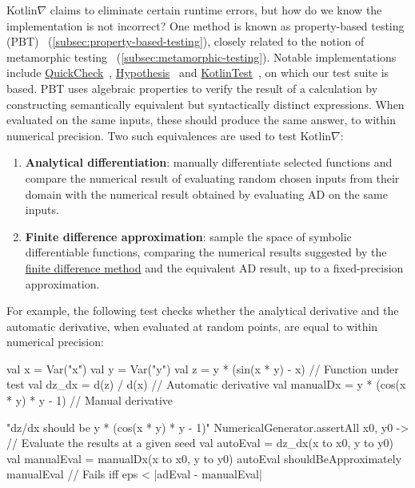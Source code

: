 \documentclass[12pt,initial,twoside,maitrise]{dms}
\numberwithin{equation}{section}
\numberwithin{table}{chapter}
\numberwithin{figure}{chapter}
\begin{document}
Kotlin$\nabla$ claims to eliminate certain runtime errors, but how do we know the implementation is not incorrect? One method is known as property-based testing (PBT)~\citep{fink1997property} (\autoref{subsec:property-based-testing}), closely related to the notion of metamorphic testing~\citep{chen1998metamorphic} (\autoref{subsec:metamorphic-testing}). Notable implementations include \href{http://www.cse.chalmers.se/~rjmh/QuickCheck/manual.html}{QuickCheck}~\citep{claessen2011quickcheck}, \href{https://hypothesis.readthedocs.io/en/latest/}{Hypothesis}~\citep{Hypothesis} and \href{https://github.com/kotlintest/kotlintest}{KotlinTest}~\citep{kotlintest}, on which our test suite is based. PBT uses algebraic properties to verify the result of a calculation by constructing semantically equivalent but syntactically distinct expressions. When evaluated on the same inputs, these should produce the same answer, to within numerical precision. Two such equivalences are used to test Kotlin$\nabla$: \\
%
\begin{enumerate}
    \item \textbf{Analytical differentiation}: manually differentiate selected functions and compare the numerical result of evaluating random chosen inputs from their domain with the numerical result obtained by evaluating AD on the same inputs.
    \item \textbf{Finite difference approximation}: sample the space of symbolic differentiable functions, comparing the numerical results suggested by the \hyperref[sec:fdm]{finite difference method} and the equivalent AD result, up to a fixed-precision approximation. \\
\end{enumerate}
%
For example, the following test checks whether the analytical derivative and the automatic derivative, when evaluated at random points, are equal to within numerical precision:
%
\begin{kotlinlisting}
val x = Var("x")
val y = Var("y")
val z = y * (sin(x * y) - x)            // Function under test
val dz_dx = d(z) / d(x)                 // Automatic derivative
val manualDx = y * (cos(x * y) * y - 1) // Manual derivative

"dz/dx should be y * (cos(x * y) * y - 1)" {
    NumericalGenerator.assertAll { x0, y0 ->
        // Evaluate the results at a given seed
        val autoEval = dz_dx(x to x0, y to y0)
        val manualEval = manualDx(x to x0, y to y0)
        autoEval shouldBeApproximately manualEval // Fails iff eps < |adEval - manualEval|
    }
}
\end{kotlinlisting}
\end{document}
